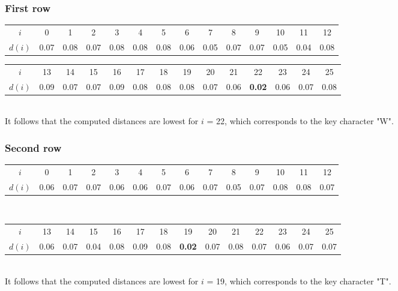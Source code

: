 \documentclass[11pt]{report}
\begin{document}
\subsubsection{First row}
\begin{tabular}{| c | c c c c c c c c c c c c c |}
\hline
$i$ & 0 & 1 & 2 & 3 & 4 & 5 & 6 & 7 & 8 & 9 & 10 & 11 & 12\\
$d(i)$ & 0.07 & 0.08 & 0.07 & 0.08 & 0.08 & 0.08 & 0.06 & 0.05 & 0.07 & 0.07 & 0.05 & 0.04 & 0.08\\
\hline
\end{tabular}
\begin{tabular}{| c | c c c c c c c c c c c c c |}
\hline
$i$ & 13 & 14 & 15 & 16 & 17 & 18 & 19 & 20 & 21 & 22 & 23 & 24 & 25\\
$d(i)$ & 0.09 & 0.07 & 0.07 & 0.09 & 0.08 & 0.08 & 0.08 & 0.07 & 0.06 & \textbf{0.02} & 0.06 & 0.07 & 0.08\\
\hline
\end{tabular}
${}$\\
It follows that the computed distances are lowest for $i$ = 22, which corresponds to the key
character "W".

\subsubsection{Second row}
\begin{tabular}{| c | c c c c c c c c c c c c c |}
\hline
$i$ & 0 & 1 & 2 & 3 & 4 & 5 & 6 & 7 & 8 & 9 & 10 & 11 & 12\\
$d(i)$ & 0.06 & 0.07 & 0.07 & 0.06 & 0.06 & 0.07 & 0.06 & 0.07 & 0.05 & 0.07 & 0.08 & 0.08 & 0.07\\
\hline
\end{tabular}
\\[0.05cm]
\begin{tabular}{| c | c c c c c c c c c c c c c |}
\hline
$i$ & 13 & 14 & 15 & 16 & 17 & 18 & 19 & 20 & 21 & 22 & 23 & 24 & 25\\
$d(i)$ 
& 0.06
& 0.07
& 0.04
& 0.08
& 0.09
& 0.08
& \textbf{0.02}
& 0.07
& 0.08
& 0.07
& 0.06
& 0.07
& 0.07\\
\hline
\end{tabular}
${}$\\
It follows that the computed distances are lowest for $i$ = 19, which corresponds to the key
character "T".
\end{document}
